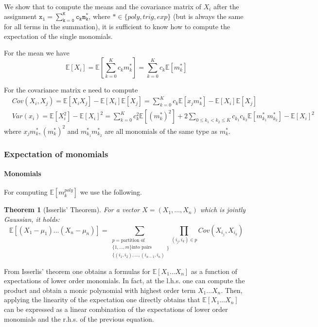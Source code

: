 \documentclass{article}
\newtheorem{theorem}{Theorem}
\newcommand{\expc}[1]{\mathbb{E}\left[ #1 \right]}
\begin{document}
We show that to compute the means and the covariance matrix of $X_i$ after the assignment $\mathtt{x_i = \sum_{k=0}^K c_k m_k^*}$, where $* \in \{poly, trig, exp\}$ (but is always the same for all terms in the summation), it is sufficient to know how to compute the expectation of the single monomials.

For the mean we have
$$ \expc{X_i} = \expc{\sum_{k=0}^K c_k m_k^*} = \sum_{k=0}^K c_k \expc{m_k^*}  $$

For the covariance matrix e need to compute
\begin{align*} 
&Cov(X_i, X_j) = \expc{X_iX_j} - \expc{X_i}\expc{X_j} = \sum_{k=0}^K c_k \expc{x_jm_k^*} - \expc{X_i}\expc{X_j} \\
&Var(x_i) = \expc{X_i^2} - \expc{X_i}^2 = \sum_{k=0}^K c_k^2 \expc{(m_k^*)^2} + 2 \sum_{0 \le k_1 < k_2 \le K} c_{k_1} c_{k_2} \expc{m_{k_1}^*m_{k_2}^*}  - \expc{X_i}^2
\end{align*}
where $x_j m_k^*, (m_k^*)^2$ and $m_{k_1}^*m_{k_2}^*$ are all monomials of the same type as $m_k^*$.

\subsubsection{Expectation of monomials}

\paragraph{Monomials}

For computing $\expc{m_k^{poly}}$ we use the following.

\begin{theorem}[Isserlis' Theorem]
For a vector $X = (X_1, \hdots, X_n)$ which is jointly Gaussian, it holds:
$$ \expc{(X_1 - \mu_1)\hdots(X_n - \mu_n)} = \sum_{\substack{p = \text{partition of} \\ \{1, \hdots, m\} \text{into pairs} \\ \{(i_1, i_2), \hdots, (i_{n-1}, i_n)}\}} \prod_{(i_j, i_k) \in p} Cov(X_{i_j}, X_{i_k}) $$ 
\end{theorem}

From Isserlis' theorem one obtains a formulas for $\expc{X_1\hdots X_n}$ as a function of expectations of lower order monomials. In fact, at the l.h.s. one can compute the product and obtain a monic polynomial with highest order term $X_1\hdots X_n$. Then, applying the linearity of the expectation one directly obtains that $\expc{X_1\hdots X_n}$ can be expressed as a linear combination of the expectations of lower order monomials and the r.h.s. of the previous equation.
\end{document}
